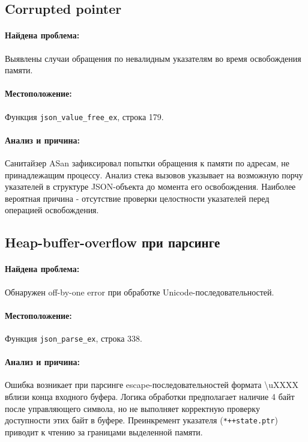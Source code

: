 \subsection{Corrupted pointer}
\paragraph{Найдена проблема:} Выявлены случаи обращения по невалидным указателям во время освобождения памяти.

\paragraph{Местоположение:} Функция \texttt{json\_value\_free\_ex}, строка 179.

\paragraph{Анализ и причина:} Санитайзер ASan зафиксировал попытки обращения к памяти по адресам, не принадлежащим процессу. Анализ стека вызовов указывает на возможную порчу указателей в структуре JSON-объекта до момента его освобождения. Наиболее вероятная причина - отсутствие проверки целостности указателей перед операцией освобождения.

\subsection{Heap-buffer-overflow при парсинге}
\paragraph{Найдена проблема:} Обнаружен off-by-one error при обработке Unicode-последовательностей.

\paragraph{Местоположение:} Функция \texttt{json\_parse\_ex}, строка 338.

\paragraph{Анализ и причина:} Ошибка возникает при парсинге escape-последовательностей формата \textbackslash uXXXX вблизи конца входного буфера. Логика обработки предполагает наличие 4 байт после управляющего символа, но не выполняет корректную проверку доступности этих байт в буфере. Преинкремент указателя (\texttt{*++state.ptr}) приводит к чтению за границами выделенной памяти.

